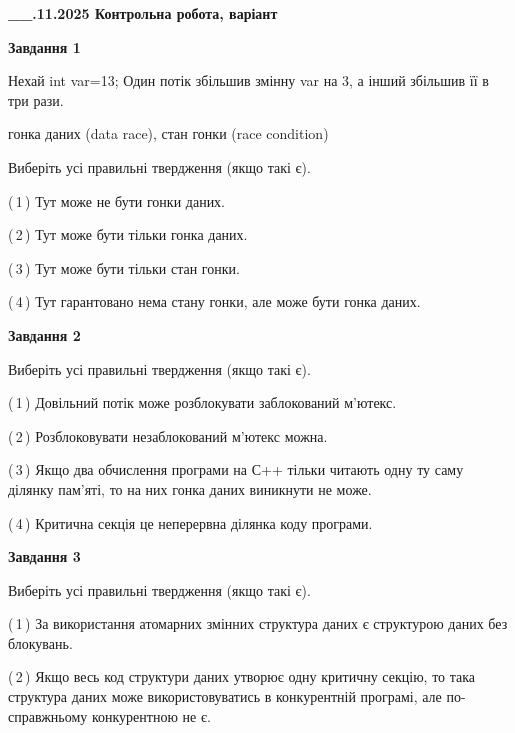 \documentclass[12pt, ukrainian]{article}
\begin{document}
\begin {large}

\textbf{\_\_.11.2025 Контрольна робота, варіант  }\par


{

\begin{center}
\textbf{Завдання 1}
\end{center}
Нехай int var=13; Один потік збільшив змінну var на 3, а інший збільшив її в три рази.

гонка даних (data race), стан гонки (race condition)

Виберіть усі правильні твердження (якщо такі є).\par
\vspace{2mm}
(\,1\,) Тут може не бути гонки даних.%

(\,2\,) Тут може бути тільки гонка даних.%

(\,3\,) Тут може бути тільки стан гонки.%

(\,4\,) Тут гарантовано нема стану гонки, але може бути гонка даних.%



\begin{center}
\textbf{Завдання 2}
\end{center}
Виберіть усі правильні твердження (якщо такі є).\par
\vspace{2mm}

(\,1\,) Довільний потік може розблокувати заблокований м’ютекс.%

(\,2\,) Розблоковувати незаблокований м’ютекс можна.%

(\,3\,) Якщо два обчислення програми на С++ тільки читають одну ту саму ділянку пам'яті, то на них гонка даних  виникнути не може.%

(\,4\,) Критична секція це неперервна ділянка коду програми.%



\begin{center}
\textbf{Завдання 3}
\end{center}
Виберіть усі правильні твердження (якщо такі є).\par
\vspace{2mm}

(\,1\,) За використання атомарних змінних структура даних є структурою даних без блокувань.%

(\,2\,) Якщо весь код структури даних утворює одну критичну секцію, то така структура даних може використовуватись в конкурентній програмі, але по-справжньо\-му конкурентною не є.%

}
\end{large}
\end{document}
